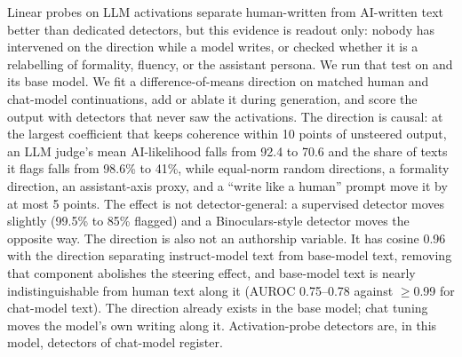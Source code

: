 Linear probes on LLM activations separate human-written from AI-written text better than dedicated detectors, but this evidence is readout only: nobody has intervened on the direction while a model writes, or checked whether it is a relabelling of formality, fluency, or the assistant persona.
We run that test on \llamai and its base model.
We fit a difference-of-means direction on matched human and chat-model continuations, add or ablate it during generation, and score the output with detectors that never saw the activations.
The direction is causal: at the largest coefficient that keeps coherence within 10 points of unsteered output, an LLM judge's mean AI-likelihood falls from 92.4 to 70.6 and the share of texts it flags falls from 98.6\% to 41\%, while equal-norm random directions, a formality direction, an assistant-axis proxy, and a ``write like a human'' prompt move it by at most 5 points.
The effect is not detector-general: a supervised detector moves slightly (99.5\% to 85\% flagged) and a Binoculars-style detector moves the opposite way.
The direction is also not an authorship variable.
It has cosine 0.96 with the direction separating instruct-model text from base-model text, removing that component abolishes the steering effect, and base-model text is nearly indistinguishable from human text along it (AUROC 0.75--0.78 against $\geq$0.99 for chat-model text).
The direction already exists in the base model; chat tuning moves the model's own writing along it.
Activation-probe detectors are, in this model, detectors of chat-model register.
